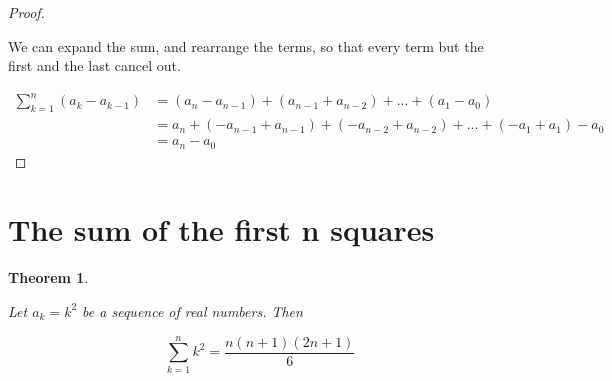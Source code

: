\documentclass{article}
\newtheorem{theorem}{Theorem}
\begin{document}
\begin{proof}
\begin{flushleft}
We can expand the sum, and rearrange the terms, so that every term but the first and the last cancel out.
\end{flushleft}
\begin{align*}
\sum_{k=1}^{n} (a_{k} - a_{k-1}) &= (a_{n} - a_{n-1}) + (a_{n-1} + a_{n-2}) + ... + (a_{1} - a_{0}) \\
&= a_{n} + (-a_{n-1} + a_{n-1}) + (-a_{n-2} + a_{n-2}) + ... + (-a_{1} + a_{1}) - a_{0} \\
&= a_{n} - a_{0}
\end{align*}

\end{proof}

\section{The sum of the first n squares}

\begin{theorem}
\begin{flushleft}
Let $a_{k} = k^2 $ be a sequence of real numbers. Then
\end{flushleft}
\begin{equation*}
\sum_{k=1}^{n} k^2 = \frac{n(n+1)(2n+1)}{6}
\end{equation*}
\end{theorem}
\end{document}

